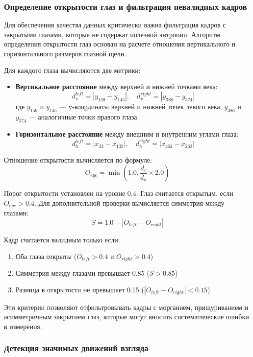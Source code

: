 \documentclass[14pt, a4paper]{extreport}
\begin{document}
\subsubsection{Определение открытости глаз и фильтрация невалидных кадров}

Для обеспечения качества данных критически важна фильтрация кадров с закрытыми глазами, которые не содержат полезной энтропии. Алгоритм определения открытости глаз основан на расчете отношения вертикального и горизонтального размеров глазной щели.

Для каждого глаза вычисляются две метрики:
\begin{itemize}
    \item \textbf{Вертикальное расстояние} между верхней и нижней точками века:
    $$d_v^{left} = |y_{159} - y_{145}|, \quad d_v^{right} = |y_{386} - y_{374}|$$
    где $y_{159}$ и $y_{145}$ --- y-координаты верхней и нижней точек левого века, $y_{386}$ и $y_{374}$ --- аналогичные точки правого глаза.
    
    \item \textbf{Горизонтальное расстояние} между внешним и внутренним углами глаза:
    $$d_h^{left} = |x_{33} - x_{133}|, \quad d_h^{right} = |x_{362} - x_{263}|$$
\end{itemize}

Отношение открытости вычисляется по формуле:
$$O_{eye} = \min\left(1.0, \frac{d_v}{d_h} \times 2.0\right)$$

Порог открытости установлен на уровне 0.4. Глаз считается открытым, если $O_{eye} > 0.4$. Для дополнительной проверки вычисляется симметрия между глазами:
$$S = 1.0 - |O_{left} - O_{right}|$$

Кадр считается валидным только если:
\begin{enumerate}
    \item Оба глаза открыты ($O_{left} > 0.4$ и $O_{right} > 0.4$)
    \item Симметрия между глазами превышает 0.85 ($S > 0.85$)
    \item Разница в открытости не превышает 0.15 ($|O_{left} - O_{right}| < 0.15$)
\end{enumerate}

Эти критерии позволяют отфильтровывать кадры с морганием, прищуриванием и асимметричным закрытием глаз, которые могут вносить систематические ошибки в измерения.

\subsubsection{Детекция значимых движений взгляда}
\end{document}
